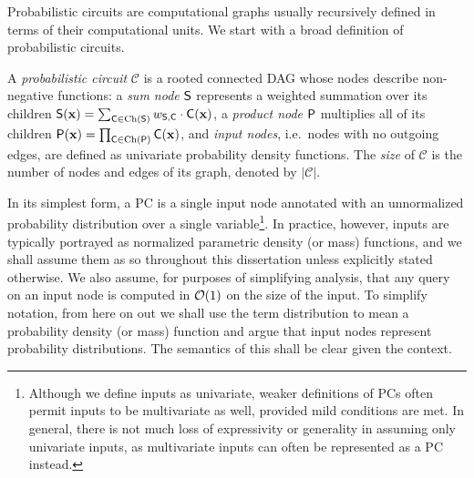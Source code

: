 Probabilistic circuits are computational graphs usually recursively defined in terms of their
computational units. We start with a broad definition of probabilistic circuits.

\begin{definition}
  A \emph{probabilistic circuit} $\mathcal{C}$ is a rooted connected DAG whose nodes describe
  non-negative functions: a \emph{sum node} $\operatorname{\textup{\textsf{S}}}$ represents a weighted summation over its
  children $\operatorname{\textup{\textsf{S}}}(\mathbf{x})=\sum_{\operatorname{\textup{\textsf{C}}}\in\operatorname*{\normalfont{Ch}}(\operatorname{\textup{\textsf{S}}})} w_{\operatorname{\textup{\textsf{S}}},\operatorname{\textup{\textsf{C}}}}\cdot\operatorname{\textup{\textsf{C}}}(\mathbf{x})$, a
  \emph{product node} $\operatorname{\textup{\textsf{P}}}$ multiplies all of its children
  $\operatorname{\textup{\textsf{P}}}(\mathbf{x})=\prod_{\operatorname{\textup{\textsf{C}}}\in\operatorname*{\normalfont{Ch}}(\operatorname{\textup{\textsf{P}}})} \operatorname{\textup{\textsf{C}}}(\mathbf{x})$, and \emph{input nodes}, i.e.\ nodes
  with no outgoing edges, are defined as univariate probability density functions.\label{def:pc}
  The \emph{size} of $\mathcal{C}$ is the number of nodes and edges of its graph, denoted by
  $|\mathcal{C}|$.
\end{definition}

In its simplest form, a PC is a single input node annotated with an unnormalized probability
distribution over a single variable\footnote{Although we define inputs as univariate, weaker
definitions of PCs often permit inputs to be multivariate as well, provided mild conditions are
met. In general, there is not much loss of expressivity or generality in assuming only univariate
inputs, as multivariate inputs can often be represented as a PC instead.}. In practice, however,
inputs are typically portrayed as normalized parametric density (or mass) functions, and we shall
assume them as so throughout this dissertation unless explicitly stated otherwise. We also assume,
for purposes of simplifying analysis, that any query on an input node is computed in $\mathcal{O}(1)$ on
the size of the input. To simplify notation, from here on out we shall use the term distribution to
mean a probability density (or mass) function and argue that input nodes represent probability
distributions. The semantics of this shall be clear given the context.

